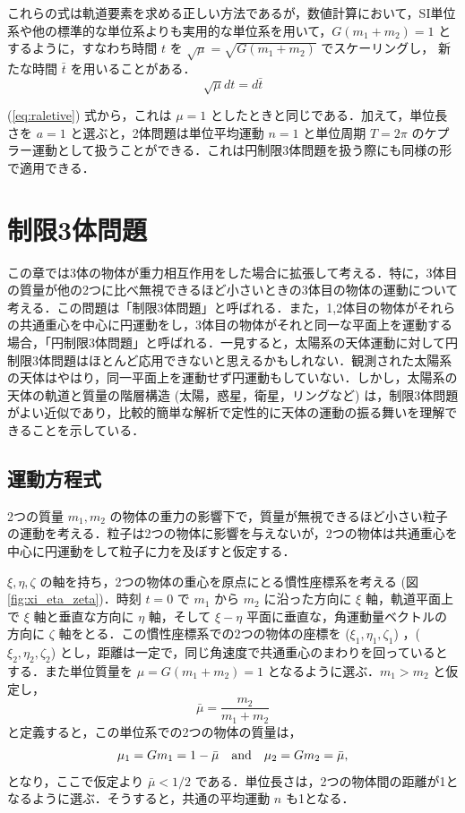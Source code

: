 \documentclass[11pt,a4paper,oneside,onecolumn]{jarticle}
\begin{document}
これらの式は軌道要素を求める正しい方法であるが，数値計算において，SI単位系や他の標準的な単位系よりも実用的な単位系を用いて，$G (m_1 + m_2) = 1$ とするように，すなわち時間 $t$ を $\sqrt{\mu} = \sqrt{G (m_1 + m_2)}$ でスケーリングし， 新たな時間 $\bar{t}$ を用いることがある．
\begin{equation}
\sqrt{\mu} dt = d \bar{t} \label{eq:tbar}
\end{equation}

(\ref{eq:raletive}) 式から，これは $\mu = 1$ としたときと同じである．加えて，単位長さを $a = 1$ と選ぶと，2体問題は単位平均運動 $n = 1$ と単位周期 $T = 2 \pi$ のケプラー運動として扱うことができる．これは円制限3体問題を扱う際にも同様の形で適用できる．


\section{制限3体問題 \label{sec:3body}}
この章では3体の物体が重力相互作用をした場合に拡張して考える．特に，3体目の質量が他の2つに比べ無視できるほど小さいときの3体目の物体の運動について考える．この問題は「制限3体問題」と呼ばれる．また，1,2体目の物体がそれらの共通重心を中心に円運動をし，3体目の物体がそれと同一な平面上を運動する場合，「円制限3体問題」と呼ばれる．一見すると，太陽系の天体運動に対して円制限3体問題はほとんど応用できないと思えるかもしれない．観測された太陽系の天体はやはり，同一平面上を運動せず円運動もしていない．しかし，太陽系の天体の軌道と質量の階層構造 (太陽，惑星，衛星，リングなど) は，制限3体問題がよい近似であり，比較的簡単な解析で定性的に天体の運動の振る舞いを理解できることを示している．

\subsection{運動方程式}
2つの質量 $m_1, m_2$ の物体の重力の影響下で，質量が無視できるほど小さい粒子の運動を考える．粒子は2つの物体に影響を与えないが，2つの物体は共通重心を中心に円運動をして粒子に力を及ぼすと仮定する．

$\xi, \eta, \zeta$ の軸を持ち，2つの物体の重心を原点にとる慣性座標系を考える (図 \ref{fig:xi_eta_zeta})．時刻 $t = 0$ で $m_1$ から $m_2$ に沿った方向に $\xi$ 軸，軌道平面上で $\xi$ 軸と垂直な方向に $\eta$ 軸，そして $\xi - \eta$ 平面に垂直な，角運動量ベクトルの方向に $\zeta$ 軸をとる．この慣性座標系での2つの物体の座標を ($\xi_1, \eta_1, \zeta_1$) ，($\xi_2, \eta_2, \zeta_2$) とし，距離は一定で，同じ角速度で共通重心のまわりを回っているとする．また単位質量を $\mu = G (m_1 + m_2) = 1$ となるように選ぶ．$m_1 > m_2$ と仮定し，
\begin{equation}
\bar{\mu} = \frac{m_2}{m_1 + m_2}
\end{equation}
と定義すると，この単位系での2つの物体の質量は，
\begin{equation}
\mu_1 = G m_1 = 1 - \bar{\mu} \quad {\rm and} \quad \mu_2 = G m_2 = \bar{\mu}, \label{eq:mu1mu2}
\end{equation}
となり，ここで仮定より $\bar{\mu} < 1/2$ である．単位長さは，2つの物体間の距離が1となるように選ぶ．そうすると，共通の平均運動 $n$ も1となる．
\end{document}
